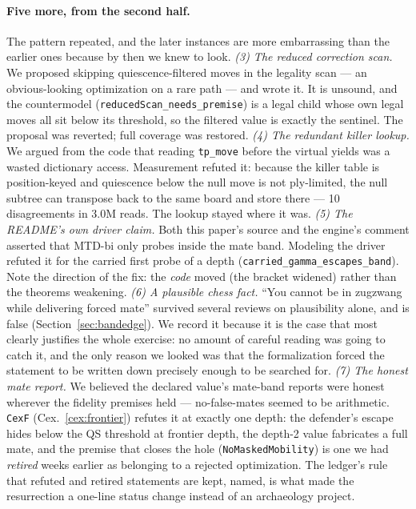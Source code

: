 \documentclass[11pt]{article}
\theoremstyle{plain}
\theoremstyle{definition}
\theoremstyle{remark}
\begin{document}
\paragraph{Five more, from the second half.}
The pattern repeated, and the later instances are more embarrassing
than the earlier ones because by then we knew to look.
\emph{(3) The reduced correction scan.}  We proposed skipping
quiescence-filtered moves in the legality scan --- an obvious-looking
optimization on a rare path --- and wrote it.  It is unsound, and the
countermodel (\texttt{reducedScan\_needs\_premise}) is a legal child
whose own legal moves all sit below its threshold, so the filtered
value is exactly the sentinel.  The proposal was reverted; full
coverage was restored.
\emph{(4) The redundant killer lookup.}  We argued from the code that
reading \texttt{tp\_move} before the virtual yields was a wasted
dictionary access.  Measurement refuted it: because the killer table is
position-keyed and quiescence below the null move is not ply-limited,
the null subtree can transpose back to the same board and store there
--- 10 disagreements in 3.0M reads.  The lookup stayed where it was.
\emph{(5) The README's own driver claim.}  Both this paper's source and
the engine's comment asserted that MTD-bi only probes inside the mate
band.  Modeling the driver refuted it for the carried first probe of a
depth (\texttt{carried\_gamma\_escapes\_band}).  Note the direction of
the fix: the \emph{code} moved (the bracket widened) rather than the
theorems weakening.
\emph{(6) A plausible chess fact.}  ``You cannot be in zugzwang while
delivering forced mate'' survived several reviews on plausibility
alone, and is false (Section~\ref{sec:bandedge}).  We record it because
it is the case that most clearly justifies the whole exercise: no
amount of careful reading was going to catch it, and the only reason we
looked was that the formalization forced the statement to be written
down precisely enough to be searched for.
\emph{(7) The honest mate report.}  We believed the declared value's
mate-band reports were honest wherever the fidelity premises held ---
no-false-mates seemed to be arithmetic.  \texttt{CexF}
(Cex.~\ref{cex:frontier}) refutes it at exactly one depth: the
defender's escape hides below the QS threshold at frontier depth, the
depth-2 value fabricates a full mate, and the premise that closes the
hole (\texttt{NoMaskedMobility}) is one we had \emph{retired} weeks
earlier as belonging to a rejected optimization.  The ledger's rule
that refuted and retired statements are kept, named, is what made the
resurrection a one-line status change instead of an archaeology
project.
\end{document}
